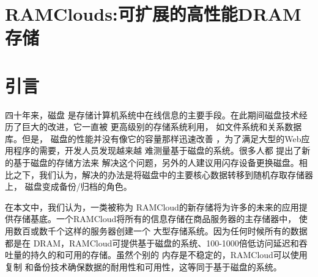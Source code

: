 \documentclass[translation]{zjutreport}
\begin{document}


\frontmatter %

\begingroup %
\let\clearpage\relax %



\titleformat{\chapter}[block]{\sihao\heiti\filcenter\bfseries}{\CJKnumber{\thechapter}}{1ex}{}{} %
\chapter*{RAMClouds:可扩展的高性能DRAM存储}
{} %





\mainmatter%
\chapter{引言}
四十年来，磁盘
是存储计算机系统中在线信息的主要手段。在此期间磁盘技术经历了巨大的改进，它一直被
更高级别的存储系统利用，
如文件系统和关系数据库。但是，
磁盘的性能并没有像它的容量那样迅速改善
，为了满足大型的Web应用程序的需要，开发人员发现越来越
难测量基于磁盘的系统。很多人都
提出了新的基于磁盘的存储方法来
解决这个问题，另外的人建议用​​闪存设备更换磁盘。相比之下，我们认为，解决的办法是将磁盘中的主要核心数据转移到随机存取存储器上，
磁盘变成备份/归档的角色。

在本文中，我们认为，一类被称为
RAMCloud的新存储将为许多的未来的应用提供存储基底。一个RAMCloud将所有的信息存储在商品服务器的主存储器中，
使用数百或数千个这样的服务器创建一个
大型存储系统。因为任何时候所有的数据都是在
DRAM，RAMCloud可提供基于磁盘的系统、100-1000倍低访问延迟和吞吐量的持久的和可用的存储。虽然个别的
内存是不稳定的，RAMCloud可以使用复制
和备份技术确保数据的耐用性和可用性，这等同于基于磁盘的系统。
\end{document}
